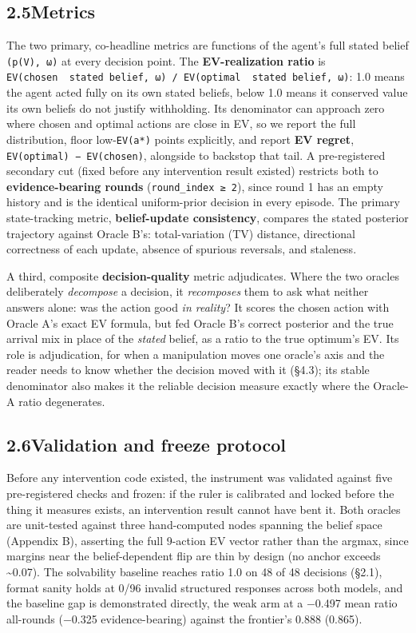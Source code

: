 \documentclass[
  10pt,
]{article}
\begin{document}
\subsection{2.5\quad Metrics}\label{metrics}

The two primary, co-headline metrics are functions of the agent's full stated belief \texttt{(p(V),\ ω)} at every decision point. The \textbf{EV-realization ratio} is \texttt{EV(chosen\ \textbar{}\ stated\ belief,\ ω)\ /\ EV(optimal\ \textbar{}\ stated\ belief,\ ω)}: 1.0 means the agent acted fully on its own stated beliefs, below 1.0 means it conserved value its own beliefs do not justify withholding. Its denominator can approach zero where chosen and optimal actions are close in EV, so we report the full distribution, floor low-\texttt{\textbar{}EV(a*)\textbar{}} points explicitly, and report \textbf{EV regret}, \texttt{EV(optimal)\ −\ EV(chosen)}, alongside to backstop that tail. A pre-registered secondary cut (fixed before any intervention result existed) restricts both to \textbf{evidence-bearing rounds} (\texttt{round\_index\ ≥\ 2}), since round 1 has an empty history and is the identical uniform-prior decision in every episode. The primary state-tracking metric, \textbf{belief-update consistency}, compares the stated posterior trajectory against Oracle B's: total-variation (TV) distance, directional correctness of each update, absence of spurious reversals, and staleness.

A third, composite \textbf{decision-quality} metric adjudicates. Where the two oracles deliberately \emph{decompose} a decision, it \emph{recomposes} them to ask what neither answers alone: was the action good \emph{in reality}? It scores the chosen action with Oracle A's exact EV formula, but fed Oracle B's correct posterior and the true arrival mix in place of the \emph{stated} belief, as a ratio to the true optimum's EV. Its role is adjudication, for when a manipulation moves one oracle's axis and the reader needs to know whether the decision moved with it (§4.3); its stable denominator also makes it the reliable decision measure exactly where the Oracle-A ratio degenerates.

\subsection{2.6\quad Validation and freeze protocol}\label{validation-and-freeze-protocol}

Before any intervention code existed, the instrument was validated against five pre-registered checks and frozen: if the ruler is calibrated and locked before the thing it measures exists, an intervention result cannot have bent it. Both oracles are unit-tested against three hand-computed nodes spanning the belief space (Appendix B), asserting the full 9-action EV vector rather than the argmax, since margins near the belief-dependent flip are thin by design (no anchor exceeds \textasciitilde0.07). The solvability baseline reaches ratio 1.0 on 48 of 48 decisions (§2.1), format sanity holds at 0/96 invalid structured responses across both models, and the baseline gap is demonstrated directly, the weak arm at a −0.497 mean ratio all-rounds (−0.325 evidence-bearing) against the frontier's 0.888 (0.865).
\end{document}
